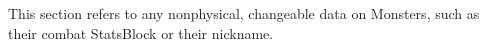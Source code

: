 
This section refers to any nonphysical, changeable data on Monsters, such as their combat StatsBlock or their nickname.

